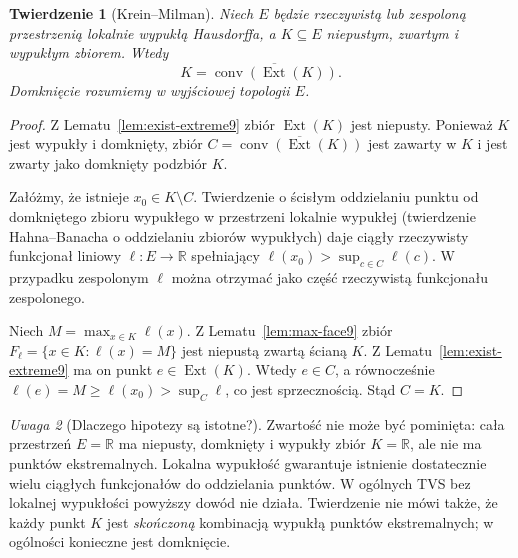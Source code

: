 \documentclass[11pt,a4paper]{article}
\numberwithin{equation}{section}
\theoremstyle{plain}
\newtheorem{twierdzenie}{Twierdzenie}[section]
\theoremstyle{definition}
\theoremstyle{remark}
\newtheorem{uwaga}[twierdzenie]{Uwaga}
\newcommand{\R}{\mathbb R}
\begin{document}
\begin{twierdzenie}[Krein--Milman]
\label{thm:krein-milman}
Niech $E$ będzie rzeczywistą lub zespoloną przestrzenią
lokalnie wypukłą Hausdorffa, a $K\subseteq E$ niepustym,
zwartym i wypukłym zbiorem. Wtedy
\[
 K=\overline{\operatorname{conv}(\operatorname{Ext}(K))}.
\]
Domknięcie rozumiemy w wyjściowej topologii $E$.
\end{twierdzenie}
\begin{proof}
Z Lematu~\ref{lem:exist-extreme9} zbiór
$\operatorname{Ext}(K)$ jest niepusty. Ponieważ $K$ jest
wypukły i domknięty, zbiór
$C=\overline{\operatorname{conv}(\operatorname{Ext}(K))}$
jest zawarty w $K$ i jest zwarty jako domknięty podzbiór $K$.

Załóżmy, że istnieje $x_0\in K\setminus C$.
Twierdzenie o ścisłym oddzielaniu punktu od domkniętego
zbioru wypukłego w przestrzeni lokalnie wypukłej
(twierdzenie Hahna--Banacha o oddzielaniu zbiorów wypukłych) daje ciągły
rzeczywisty funkcjonał liniowy $\ell:E\to\R$ spełniający
$\ell(x_0)>\sup_{c\in C}\ell(c)$. W przypadku zespolonym
$\ell$ można otrzymać jako część rzeczywistą funkcjonału
zespolonego.

Niech $M=\max_{x\in K}\ell(x)$.
Z Lematu~\ref{lem:max-face9} zbiór
$F_\ell=\{x\in K:\ell(x)=M\}$ jest niepustą zwartą
ścianą $K$. Z Lematu~\ref{lem:exist-extreme9}
ma on punkt $e\in\operatorname{Ext}(K)$.
Wtedy $e\in C$, a równocześnie
$\ell(e)=M\ge\ell(x_0)>\sup_C\ell$, co jest sprzecznością.
Stąd $C=K$.
\end{proof}

\begin{uwaga}[Dlaczego hipotezy są istotne?]
Zwartość nie może być pominięta: cała przestrzeń $E=\R$
ma niepusty, domknięty i wypukły zbiór $K=\R$,
ale nie ma punktów ekstremalnych. Lokalna wypukłość
gwarantuje istnienie dostatecznie wielu ciągłych
funkcjonałów do oddzielania punktów. W ogólnych TVS
bez lokalnej wypukłości powyższy dowód nie działa.
Twierdzenie nie mówi także, że każdy punkt $K$ jest
\emph{skończoną} kombinacją wypukłą punktów ekstremalnych;
w ogólności konieczne jest domknięcie.
\end{uwaga}
\end{document}
